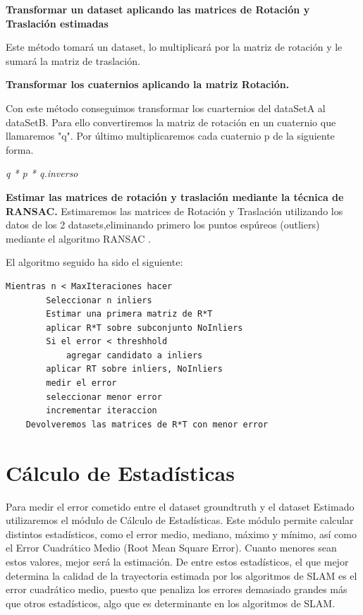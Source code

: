 \textbf{Transformar un dataset aplicando las matrices de Rotación y Traslación estimadas}

Este método tomará un dataset, lo multiplicará por la matriz de rotación y le sumará la matriz de traslación.

\textbf{Transformar los cuaternios aplicando la matriz Rotación.}

Con este método conseguimos transformar los cuarternios del dataSetA al dataSetB.		Para ello convertiremos la matriz de rotación en un cuaternio que llamaremos "q".		Por último multiplicaremos cada cuaternio p de la siguiente forma.
\begin{center}
		\textit{q * p * q.inverso }
\end{center}

\textbf{Estimar las matrices de rotación y traslación mediante la técnica de RANSAC.}
Estimaremos las matrices de Rotación y Traslación utilizando los datos de los 2 datasets,eliminando primero los puntos espúreos (outliers) mediante el algoritmo RANSAC \cite{Fischler:1981:RSC:358669.358692}.

El algoritmo seguido ha sido el siguiente:
    \begin{lstlisting}[frame=single]
	Mientras n < MaxIteraciones hacer
		Seleccionar n inliers
		Estimar una primera matriz de R*T
		aplicar R*T sobre subconjunto NoInliers
		Si el error < threshhold
			agregar candidato a inliers
		aplicar RT sobre inliers, NoInliers
		medir el error 
		seleccionar menor error
		incrementar iteraccion
	Devolveremos las matrices de R*T con menor error
	\end{lstlisting}
	        
   

\section{Cálculo de Estadísticas}

Para medir el error cometido entre el dataset groundtruth y el dataset Estimado utilizaremos el módulo de Cálculo de Estadísticas.
Este módulo permite calcular distintos estadísticos, como el error medio, mediano, máximo y mínimo, así como el Error Cuadrático Medio (Root Mean Square Error).
Cuanto menores sean estos valores, mejor será la estimación.
De entre estos estadísticos, el que mejor determina la calidad de la trayectoria estimada por los algoritmos de SLAM es el error cuadrático medio, puesto que penaliza los errores demasiado grandes más que otros estadísticos, algo que es determinante en los algoritmos de SLAM.

